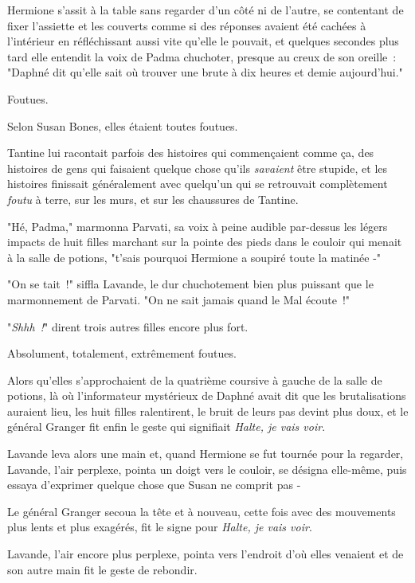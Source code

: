 Hermione s'assit à la table sans regarder d'un côté ni de l'autre, se contentant de fixer l'assiette et les couverts comme si des réponses avaient été cachées à l'intérieur en réfléchissant aussi vite qu'elle le pouvait, et quelques secondes plus tard elle entendit la voix de Padma chuchoter, presque au creux de son oreille~: "Daphné dit qu'elle sait où trouver une brute à dix heures et demie aujourd'hui."

\later

Foutues.

Selon Susan Bones, elles étaient toutes foutues.

Tantine lui racontait parfois des histoires qui commençaient comme ça, des histoires de gens qui faisaient quelque chose qu'ils \emph{savaient} être stupide, et les histoires finissait généralement avec quelqu'un qui se retrouvait complètement \emph{foutu} à terre, sur les murs, et sur les chaussures de Tantine.

"Hé, Padma," marmonna Parvati, sa voix à peine audible par-dessus les légers impacts de huit filles marchant sur la pointe des pieds dans le couloir qui menait à la salle de potions, "t'sais pourquoi Hermione a soupiré toute la matinée -"

"On se tait~!" siffla Lavande, le dur chuchotement bien plus puissant que le marmonnement de Parvati. "On ne sait jamais quand le Mal écoute~!"

"\emph{Shhh~!}" dirent trois autres filles encore plus fort.

Absolument, totalement, extrêmement foutues.

Alors qu'elles s'approchaient de la quatrième coursive à gauche de la salle de potions, là où l'informateur mystérieux de Daphné avait dit que les brutalisations auraient lieu, les huit filles ralentirent, le bruit de leurs pas devint plus doux, et le général Granger fit enfin le geste qui signifiait \emph{Halte, je vais voir}.

Lavande leva alors une main et, quand Hermione se fut tournée pour la regarder, Lavande, l'air perplexe, pointa un doigt vers le couloir, se désigna elle-même, puis essaya d'exprimer quelque chose que Susan ne comprit pas -

Le général Granger secoua la tête et à nouveau, cette fois avec des mouvements plus lents et plus exagérés, fit le signe pour \emph{Halte, je vais voir}.

Lavande, l'air encore plus perplexe, pointa vers l'endroit d'où elles venaient et de son autre main fit le geste de rebondir.

